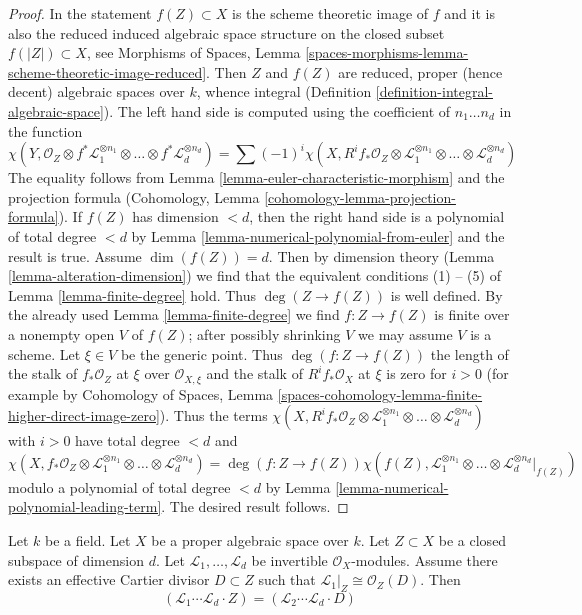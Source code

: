 \begin{proof}
In the statement $f(Z) \subset X$ is the scheme theoretic image of $f$
and it is also the reduced induced algebraic space structure on the
closed subset $f(|Z|) \subset X$, see Morphisms of Spaces, Lemma
\ref{spaces-morphisms-lemma-scheme-theoretic-image-reduced}.
Then $Z$ and $f(Z)$ are reduced, proper (hence decent) algebraic spaces
over $k$, whence integral
(Definition \ref{definition-integral-algebraic-space}).
The left hand side is computed using the coefficient of $n_1 \ldots n_d$
in the function
$$
\chi(Y, \mathcal{O}_Z \otimes f^*\mathcal{L}_1^{\otimes n_1} \otimes
\ldots \otimes f^*\mathcal{L}_d^{\otimes n_d}) =
\sum (-1)^i
\chi(X, R^if_*\mathcal{O}_Z \otimes
\mathcal{L}_1^{\otimes n_1} \otimes \ldots \otimes
\mathcal{L}_d^{\otimes n_d})
$$
The equality follows from Lemma \ref{lemma-euler-characteristic-morphism}
and the projection formula
(Cohomology, Lemma \ref{cohomology-lemma-projection-formula}).
If $f(Z)$ has dimension $< d$, then the right hand side
is a polynomial of total degree $<d$ by
Lemma \ref{lemma-numerical-polynomial-from-euler}
and the result is true. Assume $\dim(f(Z)) = d$. Then
by dimension theory (Lemma \ref{lemma-alteration-dimension})
we find that the equivalent conditions (1) -- (5) of
Lemma \ref{lemma-finite-degree} hold. Thus
$\deg(Z \to f(Z))$ is well defined.
By the already used Lemma \ref{lemma-finite-degree}
we find $f : Z \to f(Z)$ is finite over a nonempty open
$V$ of $f(Z)$; after possibly shrinking $V$ we may assume
$V$ is a scheme. Let $\xi \in V$ be the generic point.
Thus $\deg(f : Z \to f(Z))$ the length of the stalk of
$f_*\mathcal{O}_Z$ at $\xi$ over $\mathcal{O}_{X, \xi}$
and the stalk of $R^if_*\mathcal{O}_X$ at $\xi$ is zero for $i > 0$
(for example by Cohomology of Spaces, Lemma
\ref{spaces-cohomology-lemma-finite-higher-direct-image-zero}).
Thus the terms $\chi(X, R^if_*\mathcal{O}_Z \otimes
\mathcal{L}_1^{\otimes n_1} \otimes \ldots \otimes
\mathcal{L}_d^{\otimes n_d})$ with $i > 0$ have total
degree $< d$ and
$$
\chi(X, f_*\mathcal{O}_Z \otimes
\mathcal{L}_1^{\otimes n_1} \otimes \ldots \otimes
\mathcal{L}_d^{\otimes n_d})
=
\deg(f : Z \to f(Z)) \chi(f(Z),
\mathcal{L}_1^{\otimes n_1} \otimes \ldots \otimes
\mathcal{L}_d^{\otimes n_d}|_{f(Z)})
$$
modulo a polynomial of total degree $< d$ by
Lemma \ref{lemma-numerical-polynomial-leading-term}.
The desired result follows.
\end{proof}

\begin{lemma}
\label{lemma-numerical-intersection-effective-Cartier-divisor}
Let $k$ be a field. Let $X$ be a proper algebraic space over $k$.
Let $Z \subset X$ be a closed subspace of dimension $d$.
Let $\mathcal{L}_1, \ldots, \mathcal{L}_d$
be invertible $\mathcal{O}_X$-modules. Assume there exists an
effective Cartier divisor $D \subset Z$ such that
$\mathcal{L}_1|_Z \cong \mathcal{O}_Z(D)$. Then
$$
(\mathcal{L}_1 \cdots \mathcal{L}_d \cdot Z) =
(\mathcal{L}_2 \cdots \mathcal{L}_d \cdot D)
$$
\end{lemma}

